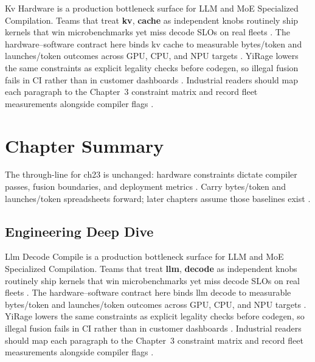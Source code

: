 Kv Hardware is a production bottleneck surface for LLM and MoE Specialized Compilation. Teams that treat \textbf{kv}, \textbf{cache} as independent knobs routinely ship kernels that win microbenchmarks yet miss decode SLOs on real fleets \citep{nvidia2022hopper,amd2024aie}. The hardware--software contract here binds kv cache to measurable bytes/token and launches/token outcomes across GPU, CPU, and NPU targets \citep{semianalysis2024tma,dlbook}. YiRage lowers the same constraints as explicit legality checks before codegen, so illegal fusion fails in CI rather than in customer dashboards \citep{amd2024xdna,dao2022flashattention}. Industrial readers should map each paragraph to the Chapter~3 constraint matrix and record fleet measurements alongside compiler flags \citep{amd2024aie,kwon2023vllm}.

\section{Chapter Summary}
\label{sec:ch23_summary}

The through-line for ch23 is unchanged: hardware constraints dictate compiler passes, fusion boundaries, and deployment metrics \citep{memoryfloor2026,amd2024xdna}. Carry bytes/token and launches/token spreadsheets forward; later chapters assume those baselines exist \citep{semianalysis2024tma,dlbook}.


\subsection{Engineering Deep Dive}
\label{sec:ch23_deep_dive}

Llm Decode Compile is a production bottleneck surface for LLM and MoE Specialized Compilation. Teams that treat \textbf{llm}, \textbf{decode} as independent knobs routinely ship kernels that win microbenchmarks yet miss decode SLOs on real fleets \citep{semianalysis2024tma,dlbook}. The hardware--software contract here binds llm decode to measurable bytes/token and launches/token outcomes across GPU, CPU, and NPU targets \citep{amd2024xdna,dao2022flashattention}. YiRage lowers the same constraints as explicit legality checks before codegen, so illegal fusion fails in CI rather than in customer dashboards \citep{amd2024aie,kwon2023vllm}. Industrial readers should map each paragraph to the Chapter~3 constraint matrix and record fleet measurements alongside compiler flags \citep{dlbook,nvidia2024cudagraphs}.

